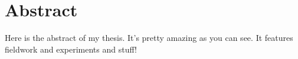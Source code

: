 \chapter*{Abstract}

Here is the abstract of my thesis.
%
It's pretty amazing as you can see. It features fieldwork and experiments and stuff! 
%

